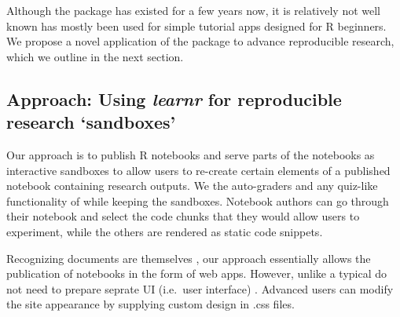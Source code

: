 Although the \DIFdelbegin \emph{} %
\DIFdelend \DIFaddbegin {} \DIFaddend package has existed for a few years now,
it is relatively not well known \DIFdelbegin {}\DIFdelend \DIFaddbegin {}\DIFaddend has mostly been used for simple tutorial apps designed
for R beginners. We propose a novel application of the \DIFdelbegin \emph{} %
\DIFdelend \DIFaddbegin {}
\DIFaddend package to advance reproducible research, which we outline in the next
section.

\hypertarget{approach-using-learnr-for-reproducible-research-sandboxes}{%
\subsection{\texorpdfstring{Approach: Using \emph{learnr} for
reproducible research
`sandboxes'}{Approach: Using learnr for reproducible research `sandboxes'}}\label{approach-using-learnr-for-reproducible-research-sandboxes}}

\DIFaddbegin {} \DIFaddend Our
approach is to publish R notebooks and serve parts of the notebooks as
interactive sandboxes to allow users to re-create certain elements of a
published notebook containing research outputs. We \DIFdelbegin {}\DIFdelend \DIFaddbegin {}\DIFaddend the
auto-graders and any quiz-like functionality of \DIFdelbegin \emph{} %
\DIFdelend \DIFaddbegin {} \DIFaddend while
keeping the sandboxes. Notebook authors can go through their notebook
and select the code chunks that they would allow users to experiment,
while the others are rendered as static code snippets.

Recognizing \DIFdelbegin \emph{} %
\DIFdelend \DIFaddbegin {} \DIFaddend documents are themselves \DIFdelbegin \emph{} %
\DIFdelend \DIFaddbegin {}\DIFaddend ,
our approach essentially allows the publication of notebooks in the form
of web apps. However, unlike a typical \DIFdelbegin \emph{} %
\DIFdelend \DIFaddbegin {}\DIFaddend do not
need to prepare \DIFaddbegin {}\DIFaddend seprate UI (i.e.~user interface) \DIFdelbegin {}\DIFdelend \DIFaddbegin {}\DIFaddend . Advanced
users can modify the site appearance by supplying custom design in .css
files.


